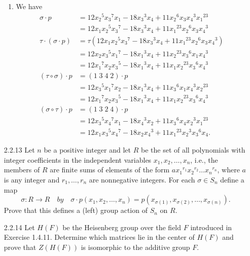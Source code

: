 \begin{enumerate}
      \begin{enumerate}
         \item We have
               \begin{align*}
                  \sigma \cdot p &= 12{x_2}^5{x_3}^7x_1-18{x_3}^3x_4+11{x_2}^6
                        x_3{x_4}^3{x_1}^{23} \\
                     &= 12x_1{x_2}^5{x_3}^7-18{x_3}^3x_4+11{x_1}^{23}{x_2}^6
                        x_3{x_4}^3 \\
                  \tau \cdot (\sigma \cdot p) &= \tau(12x_1{x_2}^5{x_3}^7-
                        18{x_3}^3x_4+11{x_1}^{23}{x_2}^6x_3{x_4}^3) \\
                     &= 12x_2{x_3}^5{x_1}^7-18{x_1}^3x_4+11{x_2}^{23}{x_3}^6
                        x_1{x_4}^3 \\
                     &= 12{x_1}^7x_2{x_3}^5-18{x_1}^3x_4+11x_1{x_2}^{23}{x_3}^6
                        {x_4}^3 \\
                  (\tau\circ\sigma) \cdot p &= (1\;3\;4\;2) \cdot p \\
                     &= 12{x_3}^5{x_1}^7x_2 - 18{x_1}^3x_4 +
                        11{x_3}^6x_1{x_4}^3{x_2}^{23} \\
                     &= 12{x_1}^7x_2{x_3}^5 - 18{x_1}^3x_4 +
                        11x_1{x_2}^{23}{x_3}^6{x_4}^3 \\
                  (\sigma\circ\tau) \cdot p &= (1\;3\;2\;4) \cdot p \\
                     &= 12{x_3}^5{x_4}^7x_1 - 18{x_4}^3x_2 +
                        11{x_3}^6x_4{x_2}^3{x_1}^{23} \\
                     &= 12x_1{x_3}^5{x_4}^7 - 18x_2{x_4}^3 +
                        11{x_1}^{23}{x_2}^3{x_3}^6x_4.
               \end{align*}

      \end{enumerate}
   \item[2.2.13]  Let $n$ be a positive integer and let $R$ be the set of all
                  polynomials with integer coefficients in the independent
                  variables $x_1, x_2, \ldots, x_n$, i.e., the members of $R$
                  are finite sums of elements of the form
                  $a{x_1}^{r_1}{x_2}^{r_2}\ldots{x_n}^{r_n}$, where $a$ is any
                  integer and $r_1, \ldots, r_n$ are nonnegative integers. For
                  each $\sigma \in S_n$ define a map
                  $$\sigma : R \rightarrow R \quad by \quad
                    \sigma \cdot p(x_1, x_2, \ldots, x_n) = p(x_{\sigma(1)},
                    x_{\sigma(2)}, \ldots, x_{\sigma(n)}).$$
                  Prove that this defines a (left) group action of $S_n$ on $R$.
   \item[2.2.14]  Let $H(F)$ be the Heisenberg group over the field $F$
                  introduced in Exercise 1.4.11. Determine which matrices lie in
                  the center of $H(F)$ and prove that $Z(H(F))$ is isomorphic to
                  the additive group $F$.
\end{enumerate}
